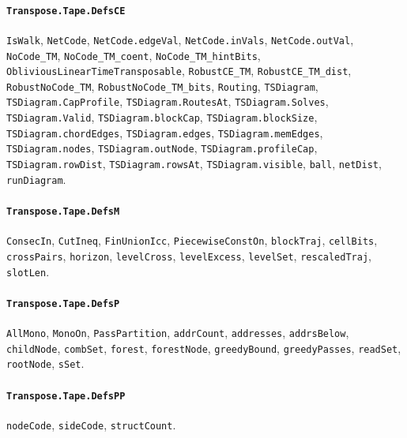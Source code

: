 \paragraph{\texttt{Transpose.Tape.DefsCE}}
{\small\raggedright \texttt{IsWalk}, \texttt{NetCode}, \texttt{NetCode.edgeVal}, \texttt{NetCode.inVals}, \texttt{NetCode.outVal}, \texttt{NoCode\_TM}, \texttt{NoCode\_TM\_coent}, \texttt{NoCode\_TM\_hintBits}, \texttt{ObliviousLinearTimeTransposable}, \texttt{RobustCE\_TM}, \texttt{RobustCE\_TM\_dist}, \texttt{RobustNoCode\_TM}, \texttt{RobustNoCode\_TM\_bits}, \texttt{Routing}, \texttt{TSDiagram}, \texttt{TSDiagram.CapProfile}, \texttt{TSDiagram.RoutesAt}, \texttt{TSDiagram.Solves}, \texttt{TSDiagram.Valid}, \texttt{TSDiagram.blockCap}, \texttt{TSDiagram.blockSize}, \texttt{TSDiagram.chordEdges}, \texttt{TSDiagram.edges}, \texttt{TSDiagram.memEdges}, \texttt{TSDiagram.nodes}, \texttt{TSDiagram.outNode}, \texttt{TSDiagram.profileCap}, \texttt{TSDiagram.rowDist}, \texttt{TSDiagram.rowsAt}, \texttt{TSDiagram.visible}, \texttt{ball}, \texttt{netDist}, \texttt{runDiagram}.\par}

\paragraph{\texttt{Transpose.Tape.DefsM}}
{\small\raggedright \texttt{ConsecIn}, \texttt{CutIneq}, \texttt{FinUnionIcc}, \texttt{PiecewiseConstOn}, \texttt{blockTraj}, \texttt{cellBits}, \texttt{crossPairs}, \texttt{horizon}, \texttt{levelCross}, \texttt{levelExcess}, \texttt{levelSet}, \texttt{rescaledTraj}, \texttt{slotLen}.\par}

\paragraph{\texttt{Transpose.Tape.DefsP}}
{\small\raggedright \texttt{AllMono}, \texttt{MonoOn}, \texttt{PassPartition}, \texttt{addrCount}, \texttt{addresses}, \texttt{addrsBelow}, \texttt{childNode}, \texttt{combSet}, \texttt{forest}, \texttt{forestNode}, \texttt{greedyBound}, \texttt{greedyPasses}, \texttt{readSet}, \texttt{rootNode}, \texttt{sSet}.\par}

\paragraph{\texttt{Transpose.Tape.DefsPP}}
{\small\raggedright \texttt{nodeCode}, \texttt{sideCode}, \texttt{structCount}.\par}

